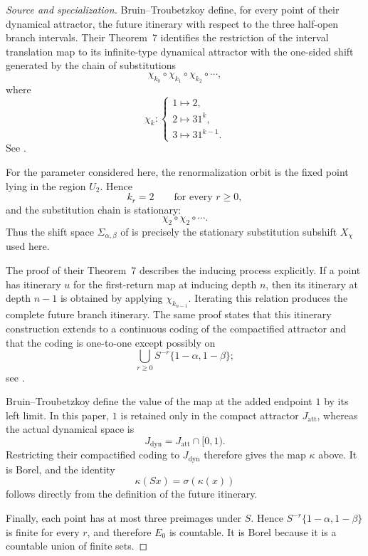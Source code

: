 \documentclass[11pt]{amsart}
\theoremstyle{plain}
\theoremstyle{definition}
\theoremstyle{remark}
\begin{document}
\begin{proof}[Source and specialization]
Bruin--Troubetzkoy define, for every point of their dynamical attractor, the future
itinerary with respect to the three half-open branch intervals. Their
Theorem~7 identifies the restriction of the interval translation map to its
infinite-type dynamical attractor with the one-sided shift generated by the chain of
substitutions
\[
        \chi_{k_0}\circ\chi_{k_1}\circ\chi_{k_2}\circ\cdots,
\]
where
\[
        \chi_k:
        \begin{cases}
        1\mapsto2,\\
        2\mapsto31^k,\\
        3\mapsto31^{k-1}.
        \end{cases}
\]
See
\cite[Theorem~7, p.~130]{BruinTroubetzkoy2003}.

For the parameter considered here, the renormalization orbit is the fixed
point lying in the region \(U_2\). Hence
\[
        k_r=2
        \qquad
        \text{for every }r\geq0,
\]
and the substitution chain is stationary:
\[
        \chi_2\circ\chi_2\circ\cdots.
\]
Thus the shift space \(\Sigma_{\alpha,\beta}\) of
\cite{BruinTroubetzkoy2003} is precisely the stationary substitution
subshift \(X_\chi\) used here.

The proof of their Theorem~7 describes the inducing process explicitly.
If a point has itinerary \(u\) for the first-return map at inducing depth
\(n\), then its itinerary at depth \(n-1\) is obtained by applying
\(\chi_{k_{n-1}}\). Iterating this relation produces the complete future
branch itinerary. The same proof states that this itinerary construction
extends to a continuous coding of the compactified attractor and that the
coding is one-to-one except possibly on
\[
        \bigcup_{r\geq0}
        S^{-r}\{1-\alpha,1-\beta\};
\]
see
\cite[proof of Theorem~7, p.~135]{BruinTroubetzkoy2003}.

Bruin--Troubetzkoy define the value of the map at the added endpoint \(1\)
by its left limit. In this paper, \(1\) is retained only in the compact
attractor \(J_{\mathrm{att}}\), whereas the actual dynamical space is
\[
        J_{\mathrm{dyn}}=J_{\mathrm{att}}\cap[0,1).
\]
Restricting their compactified coding to \(J_{\mathrm{dyn}}\) therefore
gives the map \(\kappa\) above. It is Borel, and the identity
\[
        \kappa(Sx)=\sigma(\kappa(x))
\]
follows directly from the definition of the future itinerary.

Finally, each point has at most three preimages under \(S\). Hence
\(S^{-r}\{1-\alpha,1-\beta\}\) is finite for every \(r\), and therefore
\(E_0\) is countable. It is Borel because it is a countable union of finite
sets.
\end{proof}
\end{document}
